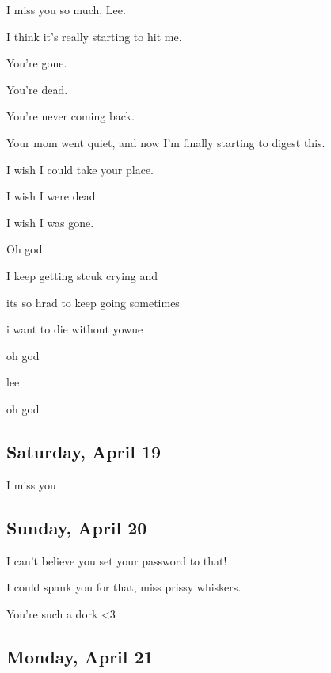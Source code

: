 {
I miss you so much, Lee.

I think it's really starting to hit
me.

You're gone.

You're dead.

You're never coming back.

Your mom went quiet, and now I'm
finally starting to digest this.

I wish I could take your place.

I wish I were dead.

I wish I was gone.

Oh god.

I keep getting stcuk crying and

its so hrad to keep going sometimes

i want to die without yowue

oh god

lee

oh god

\newpage

\subsection*{Saturday, April 19}\label{saturday-april-19}

I miss you

\newpage

\subsection*{Sunday, April 20}\label{sunday-april-20}

I can't believe you set your
password to that!

I could spank you for that, miss
prissy whiskers.

You're such a dork \textless{}3

\newpage

\subsection*{Monday, April 21}\label{monday-april-21}

}
